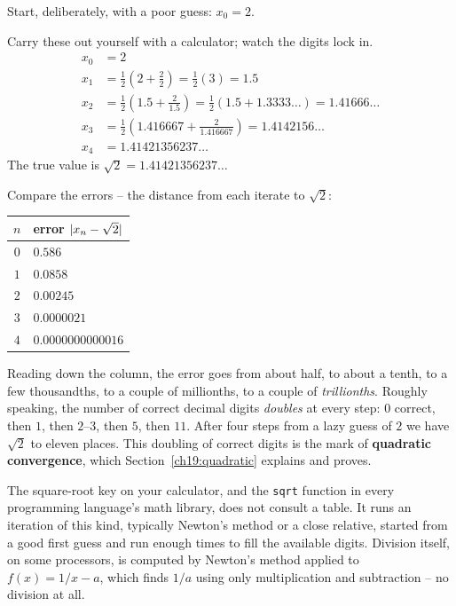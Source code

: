 Start, deliberately, with a poor guess: $x_0 = 2$.

\begin{labbox}
Carry these out yourself with a calculator; watch the digits lock in.
\begin{align*}
  x_0 &= 2 \\
  x_1 &= \tfrac12\!\left(2 + \tfrac{2}{2}\right) = \tfrac12(3) = 1.5 \\
  x_2 &= \tfrac12\!\left(1.5 + \tfrac{2}{1.5}\right) = \tfrac12(1.5 + 1.3333\ldots) = 1.41666\ldots \\
  x_3 &= \tfrac12\!\left(1.416667 + \tfrac{2}{1.416667}\right) = 1.4142156\ldots \\
  x_4 &= 1.41421356237\ldots
\end{align*}
The true value is $\sqrt2 = 1.41421356237\ldots$
\end{labbox}

Compare the errors -- the distance from each iterate to $\sqrt2$:
\begin{center}
\begin{tabular}{cl}
\toprule
$n$ & error $\lvert x_n - \sqrt2\rvert$ \\
\midrule
$0$ & $0.586$ \\
$1$ & $0.0858$ \\
$2$ & $0.00245$ \\
$3$ & $0.0000021$ \\
$4$ & $0.0000000000016$ \\
\bottomrule
\end{tabular}
\end{center}

Reading down the column, the error goes from
about half, to about a tenth, to a few thousandths, to a couple of millionths, to a
couple of \emph{trillionths}. Roughly speaking, the number of correct decimal digits
\emph{doubles} at every step: $0$ correct, then $1$, then $2$--$3$, then $5$, then
$11$. After four steps from a lazy guess of $2$ we have $\sqrt2$ to eleven places.
This doubling of correct digits is the mark of \textbf{quadratic convergence},
which Section~\ref{ch19:quadratic} explains and proves.

\begin{applicationbox}
The square-root key on your calculator, and the
\texttt{sqrt} function in every programming language's math library, does
not consult a table. It runs an iteration of this kind, typically
Newton's method or a close relative, started from a good first guess and run
enough times to fill the available digits. Division itself, on some
processors, is computed by Newton's method applied to $f(x) = 1/x - a$, which finds
$1/a$ using only multiplication and subtraction -- no division at all.
\end{applicationbox}

